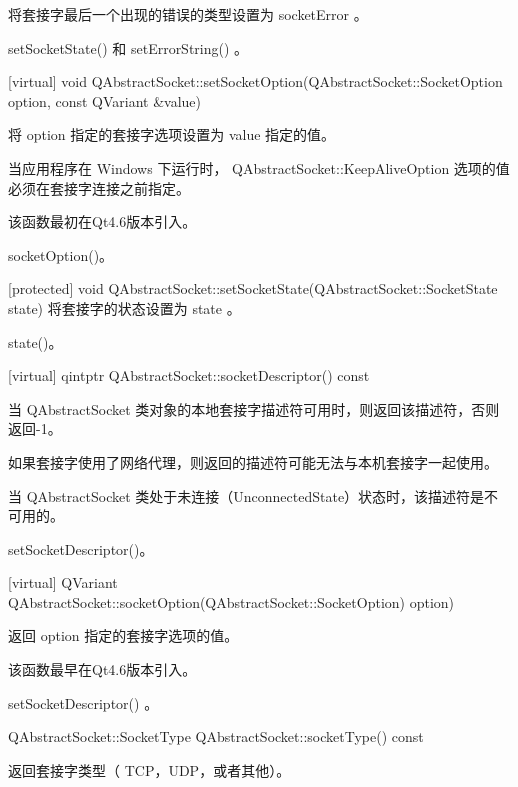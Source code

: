 将套接字最后一个出现的错误的类型设置为 socketError 。


\begin{seeAlso}
setSocketState() 和 setErrorString() 。
\end{seeAlso}

[virtual] void
QAbstractSocket::setSocketOption(QAbstractSocket::SocketOption option,
const QVariant \&value)

将 option 指定的套接字选项设置为 value 指定的值。

\begin{notice}
当应用程序在 Windows 下运行时， QAbstractSocket::KeepAliveOption 选项的值必须在套接字连接之前指定。
\end{notice}

该函数最初在Qt4.6版本引入。


\begin{seeAlso}
socketOption()。
\end{seeAlso}

[protected] void QAbstractSocket::setSocketState(QAbstractSocket::SocketState state)
将套接字的状态设置为 state 。


\begin{seeAlso}
state()。
\end{seeAlso}

[virtual] qintptr QAbstractSocket::socketDescriptor() const

当 QAbstractSocket 类对象的本地套接字描述符可用时，则返回该描述符，否则返回-1。

如果套接字使用了网络代理，则返回的描述符可能无法与本机套接字一起使用。

当 QAbstractSocket 类处于未连接（UnconnectedState）状态时，该描述符是不可用的。


\begin{seeAlso}
setSocketDescriptor()。
\end{seeAlso}


[virtual] QVariant
QAbstractSocket::socketOption(QAbstractSocket::SocketOption) option)

返回 option 指定的套接字选项的值。

该函数最早在Qt4.6版本引入。



\begin{seeAlso}
setSocketDescriptor() 。
\end{seeAlso}

QAbstractSocket::SocketType QAbstractSocket::socketType() const

返回套接字类型（ TCP，UDP，或者其他）。

